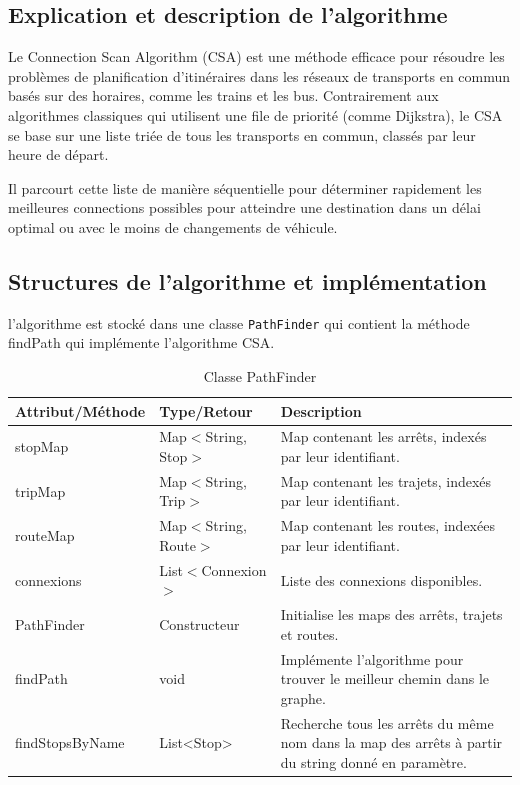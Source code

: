 \documentclass[12pt]{article}
\begin{document}
\subsection{Explication et description de l'algorithme}
Le Connection Scan Algorithm (CSA) est une méthode efficace pour résoudre les problèmes de planification d'itinéraires dans 
les réseaux de transports en commun basés sur des horaires, comme les trains et les bus. Contrairement aux algorithmes classiques 
qui utilisent une file de priorité (comme Dijkstra), le CSA se base sur une liste triée de tous les transports en commun, classés par 
leur heure de départ.

Il parcourt cette liste de manière séquentielle pour déterminer rapidement les meilleures connections possibles pour atteindre une 
destination dans un délai optimal ou avec le moins de changements de véhicule.

\subsection{Structures de l'algorithme et implémentation}
l'algorithme est stocké dans une classe \texttt{PathFinder} qui contient la méthode findPath qui implémente l'algorithme CSA.
\begin{table}[h]
  \centering
  \begin{tabular}{|l|l|p{8cm}|}
  \hline
  \textbf{Attribut/Méthode} & \textbf{Type/Retour} & \textbf{Description} \\
  \hline
  stopMap & Map$<$String, Stop$>$ & Map contenant les arrêts, indexés par leur identifiant. \\
  tripMap & Map$<$String, Trip$>$ & Map contenant les trajets, indexés par leur identifiant. \\
  routeMap & Map$<$String, Route$>$ & Map contenant les routes, indexées par leur identifiant. \\
  connexions & List$<$Connexion$>$ & Liste des connexions disponibles. \\
  \hline
  PathFinder & Constructeur & Initialise les maps des arrêts, trajets et routes. \\
  findPath & void & Implémente l'algorithme pour trouver le meilleur chemin dans le graphe. \\
  findStopsByName & List<Stop> & Recherche tous les arrêts du même nom dans la map des arrêts à partir du string donné en paramètre. \\
  \hline
  \end{tabular}
  \caption{Classe PathFinder}
\end{table}
\end{document}
